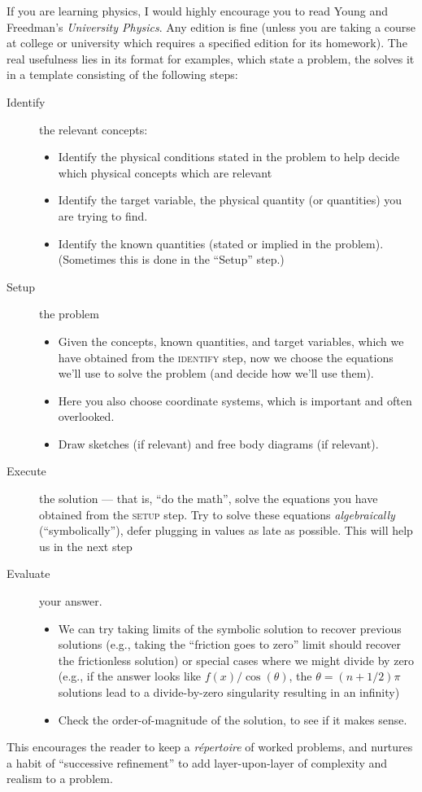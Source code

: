 \begin{remark}[``ISEE'']
If you are learning physics, I would highly encourage you to read Young
and Freedman's \emph{University Physics}. Any edition is fine (unless
you are taking a course at college or university which requires a
specified edition for its homework). The real usefulness lies in its
format for examples, which state a problem, the solves it in a template
consisting of the following steps:
\begin{description}
\item[Identify] the relevant concepts:
  \begin{itemize}
  \item Identify the physical conditions stated in the problem to help
    decide which physical concepts which are relevant
  \item Identify the target variable, the physical quantity (or quantities) you are trying to find.
  \item Identify the known quantities (stated or implied in the
    problem). (Sometimes this is done in the ``Setup'' step.)
  \end{itemize}
\item[Setup] the problem
  \begin{itemize}
  \item Given the concepts, known quantities, and target variables,
    which we have obtained from the \textsc{identify} step, now we
    choose the equations we'll use to solve the problem (and decide how
    we'll use them).
  \item Here you also choose coordinate systems, which is important and
    often overlooked.
  \item Draw sketches (if relevant) and free body diagrams (if relevant).
  \end{itemize}
\item[Execute] the solution --- that is, ``do the math'', solve the
  equations you have obtained from the \textsc{setup} step. Try to solve
  these equations \emph{algebraically} (``symbolically''), defer
  plugging in values as late as possible. This will help us in the next step
\item[Evaluate] your answer.
  \begin{itemize}
  \item We can try taking limits of the symbolic solution to recover
    previous solutions (e.g., taking the ``friction goes to zero'' limit
    should recover the frictionless solution) or special cases where we
    might divide by zero (e.g., if the answer looks like
    $f(x)/\cos(\theta)$, the $\theta=(n+1/2)\pi$ solutions lead to a
    divide-by-zero singularity resulting in an infinity)
  \item Check the order-of-magnitude of the solution, to see if it makes sense.
  \end{itemize}
\end{description}
This encourages the reader to keep a \textit{r\'{e}pertoire} of worked
problems, and nurtures a habit of ``successive refinement'' to add
layer-upon-layer of complexity and realism to a problem.
\end{remark}

